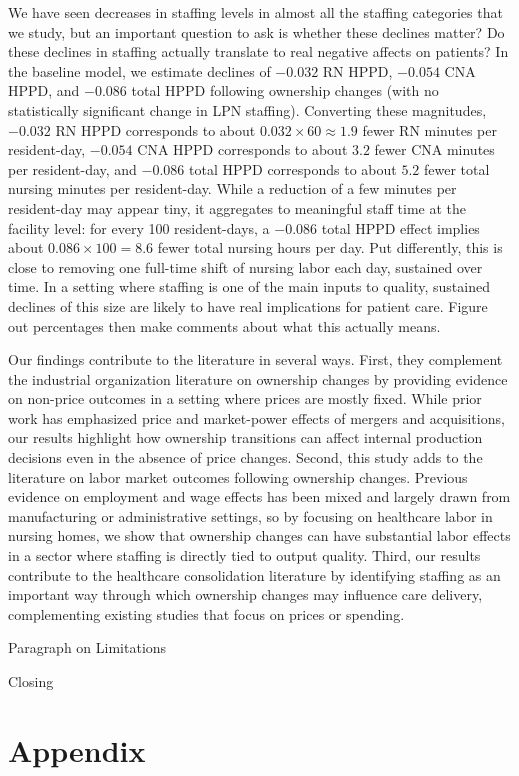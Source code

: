 \documentclass[preprint,authoryear]{elsarticle}
\begin{document}
We have seen decreases in staffing levels in almost all  the staffing categories that we study, but an important question to ask is whether these declines matter? Do these declines in staffing actually translate to real negative affects on patients? In the baseline model, we estimate declines of $-0.032$ RN HPPD, $-0.054$ CNA HPPD, and $-0.086$ total HPPD following ownership changes (with no statistically significant change in LPN staffing). Converting these magnitudes, $-0.032$ RN HPPD corresponds to about $0.032\times 60 \approx 1.9$ fewer RN minutes per resident-day, $-0.054$ CNA HPPD corresponds to about $3.2$ fewer CNA minutes per resident-day, and $-0.086$ total HPPD corresponds to about $5.2$ fewer total nursing minutes per resident-day. While a reduction of a few minutes per resident-day may appear tiny, it aggregates to meaningful staff time at the facility level: for every 100 resident-days, a $-0.086$ total HPPD effect implies about $0.086\times 100 = 8.6$ fewer total nursing hours per day. Put differently, this is close to removing one full-time shift of nursing labor each day, sustained over time. In a setting where staffing is one of the main inputs to quality, sustained declines of this size are likely to have real implications for patient care. Figure out percentages then make comments about what this actually means. 

Our findings contribute to the literature in several ways. First, they complement the industrial organization literature on ownership changes by providing evidence on non-price outcomes in a setting where prices are mostly fixed. While prior work has emphasized price and market-power effects of mergers and acquisitions, our results highlight how ownership transitions can affect internal production decisions even in the absence of price changes. Second, this study adds to the literature on labor market outcomes following ownership changes. Previous evidence on employment and wage effects has been mixed and largely drawn from manufacturing or administrative settings, so by focusing on healthcare labor in nursing homes, we show that ownership changes can have substantial labor effects in a sector where staffing is directly tied to output quality. Third, our results contribute to the healthcare consolidation literature by identifying staffing as an important way through which ownership changes may influence care delivery, complementing existing studies that focus on prices or spending.

Paragraph on Limitations

Closing

\section{Appendix}


\FloatBarrier

\nocite{*}


\end{document}
